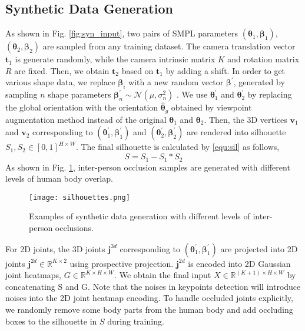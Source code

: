 \documentclass[journal]{IEEEtran}
\begin{document}
\subsection{Synthetic Data Generation}
As shown in Fig. \ref{fig:syn_input}, two pairs of SMPL parameters $(\bm{\theta}_1, \bm{\beta}_1)$,$(\bm{\theta}_2, \bm{\beta}_2)$ are sampled from any training dataset. The camera translation vector $\bm{t}_1$ is generate randomly, while the camera intrinsic matrix $K$ and rotation matrix $R$ are fixed. Then, we obtain $\bm{t}_2$ based on $\bm{t}_1$ by adding a shift. In order to get various shape data, we replace $\bm{\beta}_{i}$ with a new random vector $\bm{\beta}^{'}$, generated by sampling $n$ shape parameters $\bm{\beta}_{n}^{'} \sim \mathcal{N}(\mu,\sigma_{n}^{2})$ \cite{STRAPS2020BMVC}. We use $\bm{\theta}_{1}^{'}$ and $\bm{\theta}_{2}^{'}$ by replacing the global orientation with the orientation $\hat{\bm{\theta}}_{g}$ obtained by viewpoint augmentation method instead of the original $\bm{\theta}_{1}$ and $\bm{\theta}_{2}$. Then, the 3D vertices $\bm{v}_1$ and $\bm{v}_2$ corresponding to $(\bm{\theta}_{1}^{'}, \bm{\beta}_1^{'})$ and $(\bm{\theta}_{2}^{'}, \bm{\beta}_2^{'})$ are rendered \cite{kato2018neural} into silhouette $S_{1},S_{2} \in [0, 1]^{H \times W}$. The final silhouette is calculated by {\eqref{equ:sil}} as follows,
\begin{equation}
    S = S_{1}-S_{1}*S_{2}
    \label{equ:sil}
\end{equation}
As shown in Fig. \ref{fig:samples}, inter-person occlusion samples are generated with different levels of human body overlap.

\begin{figure}[htbp]
    \centerline{\texttt{[image: silhouettes.png]}}
    \caption{Examples of synthetic data generation with different levels of inter-person occlusions. }
    \label{fig:samples}
\end{figure}

For 2D joints, the 3D joints $\bm{j}^{3d}$ corresponding to $(\bm{\theta}_1^{'}, \bm{\beta}_1^{'})$ are projected into 2D joints $\bm{j}^{2d} \in \mathbb{R}^{K \times 2}$ using prospective projection. $\bm{j}^{2d}$ is encoded into 2D Gaussian joint heatmaps, $G \in \mathbb{R}^{K\times H\times W}$. We obtain the final input $X \in \mathbb{R}^{(K+1)\times H \times W}$ by concatenating S and G. Note that the noises in keypoints detection will introduce noises into the 2D joint heatmap encoding. To handle occluded joints explicitly, we randomly remove some body parts from the human body and add occluding boxes to the silhouette in $S$ during training.
\end{document}
